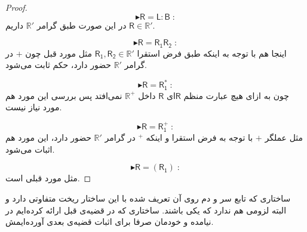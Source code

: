\begin{proof}
	
	$$\blacktriangleright \mathsf{R=L:B}\;:$$
	در این صورت طبق گرامر $\mathbb{R'}$ داریم  
	$\mathsf{R} \in \mathbb{R'}$.
	
	$$\blacktriangleright \mathsf{R=R_1 R_2}\;:$$
	اینجا هم با توجه به اینکه طبق فرض استقرا 
	$\mathsf{R_1 , R_2} \in \mathbb{R'}$
	مثل مورد قبل چون $+$ در گرامر $\mathbb{R'}$ حضور دارد، حکم ثابت می‌شود.
	
	$$\blacktriangleright \mathsf{R=R_1^*}\;:$$
	چون به ازای هیچ عبارت منظم $\mathsf{R}$ای $\mathsf{R}$ داخل $\mathbb{R^+}$ نمی‌افتد پس بررسی این مورد هم مورد نیاز نیست.
	
	
	$$\blacktriangleright \mathsf{R=R_1^+}\;:$$
	مثل عملگر $+$ با توجه به فرض استقرا و اینکه $ ^+$ در گرامر $\mathbb{R'}$ حضور دارد، این مورد هم اثبات می‌شود.
	
	
	$$\blacktriangleright \mathsf{R=(R_1)}\;:$$
	مثل مورد قبلی است.
	
	
	
	
	
	
	
\end{proof}

ساختاری که تابع سر و دم روی آن تعریف شده با این ساختار ریخت متفاوتی دارد و البته لزومی هم ندارد که یکی باشند. ساختاری که در قضیه‌ی قبل ارائه کرده‌ایم در \cite{calcul} نیامده و خودمان صرفا برای اثبات قضیه‌ی بعدی آورده‌ایمش.



